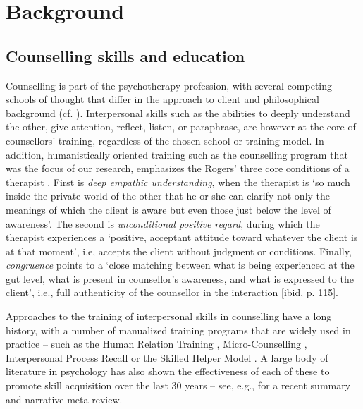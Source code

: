 \documentclass{sigchi}
\begin{document}
\section{Background}
\subsection{Counselling skills and education}
Counselling is part of the psychotherapy profession, with several competing schools of thought that differ in the approach to client and philosophical background (cf. \cite{Coyle2007}). Interpersonal skills such as the abilities to deeply understand the other, give attention, reflect, listen, or paraphrase, are however at the core of counsellors' training, regardless of the chosen school or training model. In addition, humanistically oriented training such as the counselling program that was the focus of our research, emphasizes the Rogers' three core conditions of a therapist \cite{Rogers1980}. First is \emph{deep empathic understanding}, when the therapist is `so much inside the private world of the other that he or she can clarify not only the meanings of which the client is aware but even those just below the level of awareness'. The second is \emph{unconditional positive regard}, during which the therapist experiences a `positive, acceptant attitude toward whatever the client is at that moment', i.e, accepts the client without judgment or conditions. Finally, \emph{congruence} points to a `close matching between what is being experienced at the gut level, what is present in counsellor's awareness, and what is expressed to the client', i.e., full authenticity of the counsellor in the interaction [ibid, p. 115]. 


Approaches to the training of interpersonal skills in counselling have a long history, with a number of manualized training programs that are widely used in practice -- such as the Human Relation Training \cite{Carkhuff1972}, Micro-Counselling \cite{Ivey1971}, Interpersonal Process Recall \cite{Kagan1984} or the Skilled Helper Model \cite{Egan2013}. A large body of literature in psychology has also shown the effectiveness of each of these to promote skill acquisition over the last 30 years -- see, e.g., \cite{Hill2006} for a recent summary and narrative meta-review. 
\end{document}
